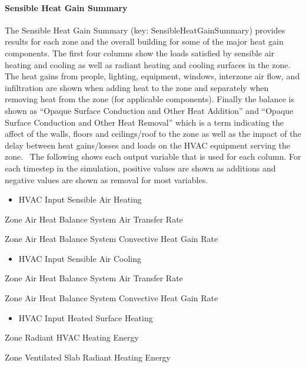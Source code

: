 \paragraph{Sensible Heat Gain Summary}\label{sensible-heat-gain-summary}

The Sensible Heat Gain Summary (key: SensibleHeatGainSummary) provides results for each zone and the overall building for some of the major heat gain components. The first four columns show the loads satisfied by sensible air heating and cooling as well as radiant heating and cooling surfaces in the zone. The heat gains from people, lighting, equipment, windows, interzone air flow, and infiltration are shown when adding heat to the zone and separately when removing heat from the zone (for applicable components). Finally the balance is shown as ``Opaque Surface Conduction and Other Heat Addition'' and ``Opaque Surface Conduction and Other Heat Removal'' which is a term indicating the affect of the walls, floors and ceilings/roof to the zone as well as the impact of the delay between heat gains/losses and loads on the HVAC equipment serving the zone.~ The following shows each output variable that is used for each column. For each timestep in the simulation, positive values are shown as additions and negative values are shown as removal for most variables.

\begin{itemize}
\tightlist
\item
  HVAC Input Sensible Air Heating
\end{itemize}

Zone Air Heat Balance System Air Transfer Rate

Zone Air Heat Balance System Convective Heat Gain Rate

\begin{itemize}
\tightlist
\item
  HVAC Input Sensible Air Cooling
\end{itemize}

Zone Air Heat Balance System Air Transfer Rate

Zone Air Heat Balance System Convective Heat Gain Rate

\begin{itemize}
\tightlist
\item
  HVAC Input Heated Surface Heating
\end{itemize}

Zone Radiant HVAC Heating Energy

Zone Ventilated Slab Radiant Heating Energy

